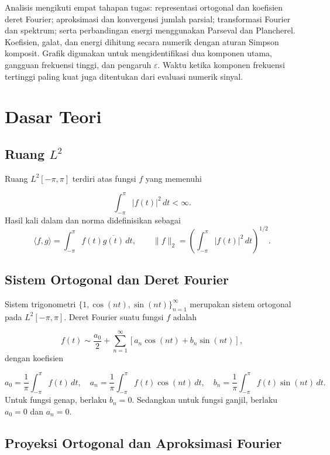 \documentclass[11pt,a4paper]{article}
\begin{document}
Analisis mengikuti empat tahapan tugas: representasi ortogonal dan
koefisien deret Fourier; aproksimasi dan konvergensi jumlah parsial;
transformasi Fourier dan spektrum; serta perbandingan energi menggunakan
Parseval dan Plancherel. Koefisien, galat, dan energi dihitung secara
numerik dengan aturan Simpson komposit. Grafik digunakan untuk
mengidentifikasi dua komponen utama, gangguan frekuensi tinggi, dan
pengaruh $\varepsilon$. Waktu ketika komponen frekuensi tertinggi paling
kuat juga ditentukan dari evaluasi numerik sinyal.

\section{Dasar Teori}
\subsection{Ruang $L^2$}\label{sub ruang L^2} \nocite{bahanajar_kuliah1-4}

Ruang $L^2[-\pi,\pi]$ terdiri atas fungsi $f$ yang memenuhi

$$
  \int_{-\pi}^{\pi}|f(t)|^2\,dt<\infty.
$$
Hasil kali dalam dan norma didefinisikan sebagai
\[
 \langle f,g\rangle=\int_{-\pi}^{\pi}f(t)\overline{g(t)}\,dt,
 \qquad
 \|f\|_2=\left(\int_{-\pi}^{\pi}|f(t)|^2\,dt\right)^{1/2}.
\]

\subsection{Sistem Ortogonal dan Deret Fourier} \label{sub sistem ortogonal}
Sistem trigonometri
$
  \{1,\cos(nt),\sin(nt)\}_{n=1}^{\infty}
$
merupakan sistem ortogonal pada $L^2[-\pi,\pi]$.
Deret Fourier suatu fungsi $f$ adalah

$$
  f(t)
  \sim
  \frac{a_0}{2}
  +
  \sum_{n=1}^{\infty}
  \left[
    a_n\cos(nt)+b_n\sin(nt)
    \right],
$$
dengan koefisien

$$
  a_0
  =
  \frac{1}{\pi}
  \int_{-\pi}^{\pi}f(t)\,dt,
  \quad
  a_n
  =
  \frac{1}{\pi}
  \int_{-\pi}^{\pi}f(t)\cos(nt)\,dt,
  \quad
  b_n
  =
  \frac{1}{\pi}
  \int_{-\pi}^{\pi}f(t)\sin(nt)\,dt.
$$
Untuk fungsi genap, berlaku
$
  b_n=0.
$ Sedangkan untuk fungsi ganjil, berlaku $a_0=0$ dan $a_n=0.$

\subsection{Proyeksi Ortogonal dan Aproksimasi Fourier} \label{proyeksi ortogonal}
\end{document}
